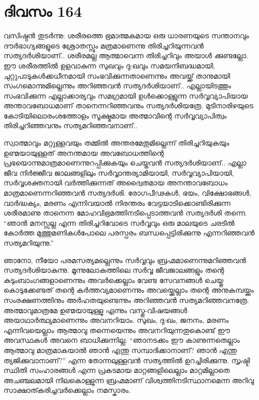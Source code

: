 \section{ദിവസം 164}


വസിഷ്ഠൻ തുടർന്നു: ശരീരത്തെ ഭ്രമാത്മകമായ ഒരു ധാരണയുടെ സന്താനവും ദൗർഭാഗ്യങ്ങളുടെ ശ്രോതസ്സും മത്രമാണെന്നു തിരിച്ചറിയുന്നവൻ സത്യദർശിയാണ്‌..  ശരീരമല്ല ആത്മാവെന്ന തിരിച്ചറിവും അയാൾ ക്കുണ്ടല്ലോ. ഈ ശരീരത്തിൽ ഉളവാകുന്ന സുഖവും ദു:ഖവും സമയനിബദ്ധമായി, ചുറ്റുപാടുകൾക്കധീനമായി സംഭവിക്കുന്നതാണെന്നും അവയ്ക്ക് താനുമായി സംഗമൊന്നുമില്ലെന്നും അറിഞ്ഞവൻ സത്യദർശിയാണ്‌..  എല്ലായിടത്തും സംഭവിക്കുന്ന എല്ലാക്കാര്യവും സമഗ്രമായി ഉൾക്കൊള്ളുന്ന സർവ്വവ്യാപിയായ അന്താവബോധമാണ്‌ താനെന്നറിഞ്ഞവനും സത്യദർശിയത്രേ. മുടിനാരിഴയുടെ കോടിയിലൊരംശത്തോളം സൂക്ഷ്മമായ അത്മാവിന്റെ സർവ്വവ്യാപിത്വം തിരിച്ചറിഞ്ഞവനും സത്യമറിഞ്ഞവനാണ്‌..

സ്വാത്മാവും മറ്റുള്ളവയും തമ്മിൽ അന്തരമേതുമില്ലെന്ന് തിരിച്ചറിയുകയും ഉണ്മയായുള്ളത് അനന്തമായ അവബോധത്തിന്റെ പ്രഭയൊന്നുമാത്രമാണെന്നുറപ്പിക്കുകയും ചെയ്തവൻ സത്യദർശിയാണ്‌.. എല്ലാ ജീവ നിർജ്ജീവ ജാലങ്ങളിലും സർവ്വാന്തര്യാമിയായി, സർവ്വവ്യാപിയായി, സർവ്വശക്തനായി വർത്തിക്കുന്നത് അദ്വൈതമായ അനന്താവബോധം മാത്രമാണെന്നറിഞ്ഞവൻ സത്യദർശി. രോഗപീഢകൾ, ഭയം, വിക്ഷോഭങ്ങൾ, വാർദ്ധക്യം, മരണം എന്നിവയാൽ നിരന്തരം വേട്ടയാടിക്കൊണ്ടിരിക്കുന്ന ശരീരമാണു താനെന്ന മോഹവിഭ്രമത്തിനടിപ്പെടാത്തവൻ സത്യദർശി തന്നെ. “ഞാൻ മനസ്സല്ല എന്ന തിരിച്ചറിവോടെ സർവ്വവും ഒരു മാലയുടെ ചരടിൽ കോർത്ത മുത്തുമണികൾപോലെ പരസ്പരം ബന്ധപ്പെട്ടിരിക്കുന്നു എന്നറിഞ്ഞവൻ സത്യമറിയുന്നു.”

ഞാനോ, നീയോ പരമസത്യമല്ലെന്നും സര്‍വ്വവും ബ്രഹ്മമാണെന്നുമറിഞ്ഞവൻ സത്യദർശിയാകുന്നു. മൂന്നുലോകത്തിലെ സർവ്വ ജീവജാലങ്ങളും തന്റെ കുടുംബാംഗങ്ങളാണെന്നും അവർക്കെല്ലാം വേണ്ട സേവനങ്ങൾ ചെയ്തു കൊടുക്കേണ്ടത് തന്റെ കർത്തവ്യമാണെന്നും അവയ്ക്കെല്ലാം തന്റെ അനുകമ്പയ്ക്കും സംരക്ഷണത്തിനും അർഹതയുണ്ടെന്നും അറിഞ്ഞവൻ സത്യമറിഞ്ഞവനത്രേ. അത്മാവുമാത്രമേ ഉണ്മയായുള്ളു എന്നും വസ്തു-വിഷയങ്ങൾ അയാഥാർത്ഥ്യമാണെന്നും അവനറിയാം. സുഖം, ദു:ഖം, ജനനം, മരണം എന്നിവയെല്ലാം ആത്മാവു തന്നെയെന്നും അവനറിയുന്നതുകൊണ്ട് ഈ അവസ്ഥകൾ അവനെ ബാധിക്കുന്നില്ല. “ഞാനടക്കം ഈ കാണുന്നതെല്ലാം ആത്മാവു മാത്രമാകയാൽ ഞാൻ എന്തു സമ്പാദിക്കാനാണ്‌? ഞാൻ എന്തു ത്യജിക്കുവാനാണ്‌?” എന്ന തോന്നലുള്ളവൻ സത്യത്തിൽ ഉറച്ചിരിക്കുന്നു. സൃഷ്ടി സ്ഥിതി സംഹാരങ്ങൾ എന്ന പ്രകടമായ മാറ്റങ്ങളിലെല്ലാം മാറ്റമില്ലാതെ അചഞ്ചലമായി നിലകൊള്ളുന്ന ബ്രഹ്മമാണ്‌ വിശ്വത്തിനടിസ്ഥാനമെന്ന അറിവു സാക്ഷാത്കരിച്ചവർക്കെല്ലാം നമസ്കാരം. 

